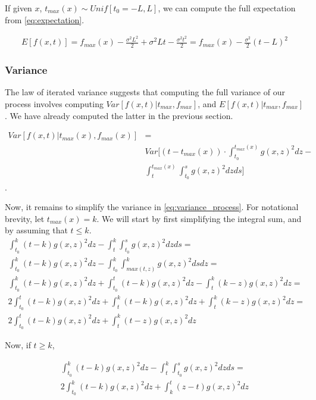 If given $x$, $t_{max}(x) \sim Unif[t_0 = -L, L]$, we can compute the full expectation from \eqref{eq:expectation}.

\begin{align}
    E[f(x,t)] = f_{max}(x)  - \frac{\sigma^2 L^2}{2} + \sigma^2 Lt -  \frac{\sigma^2 t^2}{2} = f_{max}(x) - \frac{\sigma^2}{2}(t - L)^2
\end{align}
\subsubsection{Variance}
The law of iterated variance suggests that computing the full variance of our process involves computing $Var[f(x,t) | t_{max}, f_{max}]$, and $E[f(x,t) | t_{max}, f_{max}]$. We have already computed the latter in the previous section. 

\begin{align}
    \label{eq:variance_process}
    Var[f(x,t) | t_{max}(x), f_{max}(x)] & = \nonumber \\ & Var\bigg[ (t - t_{max}(x)) \cdot \int_{t_0}^{t_{max}(x)} g(x,z)^2 dz - \nonumber \\ & \int_{t}^{t_{max}(x)} \int_{t_0}^s g(x,z)^2 dzds \bigg] 
\end{align}.

Now, it remains to simplify the variance in \eqref{eq:variance_process}.
For notational brevity, let $t_{max}(x) = k$. We will start by first simplifying the integral sum, and by assuming that $t \leq k$.
\begin{align}
    \int_{t_0}^k (t-k) g(x,z)^2dz - \int_t^k \int_{t_0}^s g(x,z)^2 dz ds \nonumber = \\
    \int_{t_0}^k (t-k) g(x,z)^2dz - \int_{t_0}^k \int_{max(t,z)}^k g(x,z)^2dsdz = \nonumber \\
    \int_{t_0}^k (t-k) g(x,z)^2dz + \int_{t_0}^t (t - k) g(x,z)^2dz - \int_{t}^k (k -z) g(x,z)^2dz  = \nonumber \\
     2 \int_{t_0}^t (t - k) g(x,z)^2dz + \int_{t}^k (t-k) g(x,z)^2dz + \int_{t}^k (k -z) g(x,z)^2dz = \nonumber \\
      2 \int_{t_0}^t (t - k) g(x,z)^2dz + \int_{t}^k (t-z) g(x,z)^2dz
\end{align}

Now, if $t \geq k$,

\begin{align}
    \int_{t_0}^k (t-k) g(x,z)^2dz - \int_t^k \int_{t_0}^s g(x,z)^2 dz ds \nonumber = \\
    2 \int_{t_0}^k (t - k) g(x,z)^2dz + 
 \int_{k}^t (z-t) g(x,z)^2dz
\end{align}

